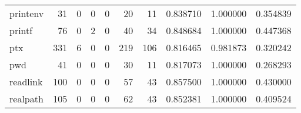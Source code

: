 \begin{tabular}{lrrrrrrrrr}
printenv  &                                        31 &                                                  0 &                                                  0 &                                                  0 &                                                 20 &                                                 11 &                                           0.838710 &                               1.000000 &                             0.354839 \\
printf    &                                        76 &                                                  0 &                                                  2 &                                                  0 &                                                 40 &                                                 34 &                                           0.848684 &                               1.000000 &                             0.447368 \\
ptx       &                                       331 &                                                  6 &                                                  0 &                                                  0 &                                                219 &                                                106 &                                           0.816465 &                               0.981873 &                             0.320242 \\
pwd       &                                        41 &                                                  0 &                                                  0 &                                                  0 &                                                 30 &                                                 11 &                                           0.817073 &                               1.000000 &                             0.268293 \\
readlink  &                                       100 &                                                  0 &                                                  0 &                                                  0 &                                                 57 &                                                 43 &                                           0.857500 &                               1.000000 &                             0.430000 \\
realpath  &                                       105 &                                                  0 &                                                  0 &                                                  0 &                                                 62 &                                                 43 &                                           0.852381 &                               1.000000 &                             0.409524 \\

\end{tabular}
